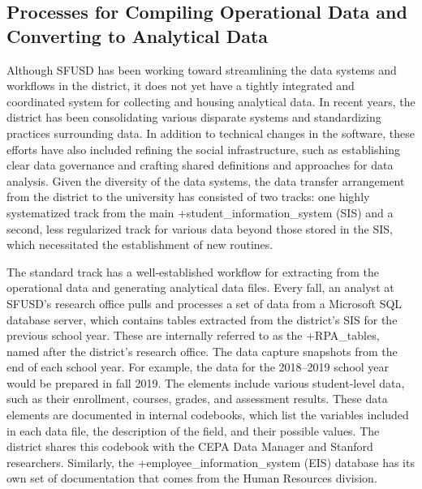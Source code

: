 \documentclass[
]{book}
\begin{document}
\hypertarget{processes-for-compiling-operational-data-and-converting-to-analytical-data}{%
\subsection{Processes for Compiling Operational Data and Converting to Analytical Data}\label{processes-for-compiling-operational-data-and-converting-to-analytical-data}}

Although SFUSD has been working toward streamlining the data systems and workflows in the district, it does not yet have a tightly integrated and coordinated system for collecting and housing analytical data. In recent years, the district has been consolidating various disparate systems and standardizing practices surrounding data. In addition to technical changes in the software, these efforts have also included refining the social infrastructure, such as establishing clear data governance and crafting shared definitions and approaches for data analysis. Given the diversity of the data systems, the data transfer arrangement from the district to the university has consisted of two tracks: one highly systematized track from the main +student\_information\_system\textbar{} (SIS) and a second, less regularized track for various data beyond those stored in the SIS, which necessitated the establishment of new routines.

The standard track has a well-established workflow for extracting from the operational data and generating analytical data files. Every fall, an analyst at SFUSD's research office pulls and processes a set of data from a Microsoft SQL database server, which contains tables extracted from the district's SIS for the previous school year. These are internally referred to as the +RPA\_tables\textbar, named after the district's research office. The data capture snapshots from the end of each school year. For example, the data for the 2018--2019 school year would be prepared in fall 2019. The elements include various student-level data, such as their enrollment, courses, grades, and assessment results. These data elements are documented in internal codebooks, which list the variables included in each data file, the description of the field, and their possible values. The district shares this codebook with the CEPA Data Manager and Stanford researchers. Similarly, the +employee\_information\_system\textbar{} (EIS) database has its own set of documentation that comes from the Human Resources division.
\end{document}
